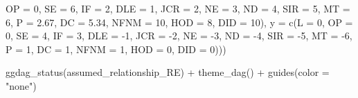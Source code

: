 \documentclass[
]{article}
\newenvironment{Shaded}{\begin{snugshade}}{\end{snugshade}}
\newcommand{\AttributeTok}[1]{\textcolor[rgb]{0.77,0.63,0.00}{#1}}
\newcommand{\DecValTok}[1]{\textcolor[rgb]{0.00,0.00,0.81}{#1}}
\newcommand{\FloatTok}[1]{\textcolor[rgb]{0.00,0.00,0.81}{#1}}
\newcommand{\FunctionTok}[1]{\textcolor[rgb]{0.00,0.00,0.00}{#1}}
\newcommand{\NormalTok}[1]{#1}
\newcommand{\SpecialCharTok}[1]{\textcolor[rgb]{0.00,0.00,0.00}{#1}}
\newcommand{\StringTok}[1]{\textcolor[rgb]{0.31,0.60,0.02}{#1}}
\begin{document}
\begin{Shaded}
\begin{Highlighting}[]
                                                              \AttributeTok{OP =} \DecValTok{0}\NormalTok{,}
                                                              \AttributeTok{SE =} \DecValTok{6}\NormalTok{, }\AttributeTok{IF =} \DecValTok{2}\NormalTok{,}
                                                              \AttributeTok{DLE =} \DecValTok{1}\NormalTok{, }\AttributeTok{JCR =} \DecValTok{2}\NormalTok{, }\AttributeTok{NE =} \DecValTok{3}\NormalTok{, }\AttributeTok{ND =} \DecValTok{4}\NormalTok{, }\AttributeTok{SIR =} \DecValTok{5}\NormalTok{, }\AttributeTok{MT =} \DecValTok{6}\NormalTok{,}
                                                              \AttributeTok{P =} \FloatTok{2.67}\NormalTok{,}
                                                              \AttributeTok{DC =} \FloatTok{5.34}\NormalTok{,}
                                                              \AttributeTok{NFNM =} \DecValTok{10}\NormalTok{,}
                                                              \AttributeTok{HOD =} \DecValTok{8}\NormalTok{,}
                                                              \AttributeTok{DID =} \DecValTok{10}\NormalTok{), }
                                                        \AttributeTok{y =}  \FunctionTok{c}\NormalTok{(}\AttributeTok{L =} \DecValTok{0}\NormalTok{,}
                                                              \AttributeTok{OP =} \DecValTok{0}\NormalTok{,}
                                                              \AttributeTok{SE =} \DecValTok{4}\NormalTok{, }\AttributeTok{IF =} \DecValTok{3}\NormalTok{,}
                                                              \AttributeTok{DLE =} \SpecialCharTok{{-}}\DecValTok{1}\NormalTok{, }\AttributeTok{JCR =} \SpecialCharTok{{-}}\DecValTok{2}\NormalTok{, }\AttributeTok{NE =} \SpecialCharTok{{-}}\DecValTok{3}\NormalTok{, }\AttributeTok{ND =} \SpecialCharTok{{-}}\DecValTok{4}\NormalTok{, }\AttributeTok{SIR =} \SpecialCharTok{{-}}\DecValTok{5}\NormalTok{, }\AttributeTok{MT =} \SpecialCharTok{{-}}\DecValTok{6}\NormalTok{,}
                                                              \AttributeTok{P =} \DecValTok{1}\NormalTok{,}
                                                              \AttributeTok{DC =} \DecValTok{1}\NormalTok{,}
                                                              \AttributeTok{NFNM =} \DecValTok{1}\NormalTok{,}
                                                              \AttributeTok{HOD =} \DecValTok{0}\NormalTok{,}
                                                              \AttributeTok{DID =} \DecValTok{0}\NormalTok{)))}

\FunctionTok{ggdag\_status}\NormalTok{(assumed\_relationship\_RE) }\SpecialCharTok{+}
  \FunctionTok{theme\_dag}\NormalTok{() }\SpecialCharTok{+}
  \FunctionTok{guides}\NormalTok{(}\AttributeTok{color =} \StringTok{"none"}\NormalTok{)}
\end{Highlighting}
\end{Shaded}
\end{document}
